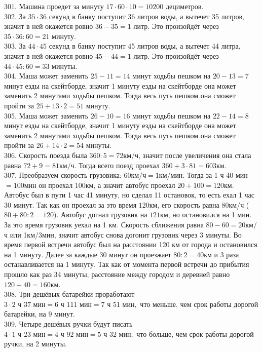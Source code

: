 301. Машина проедет за минуту $17\cdot60\cdot10=10200$ дециметров.\\
302. За $35\cdot36$ секунд в банку поступит 36 литров воды, а вытечет 35 литров, значит в ней окажется ровно $36-35=1$ литр. Это произойдёт через $35\cdot36:60=21$ минуту.\\
303. За $44\cdot45$ секунд в банку поступит 45 литров воды, а вытечет 44 литра, значит в ней окажется ровно $45-44=1$ литр. Это произойдёт через $44\cdot45:60=33$ минуты.\\
304. Маша может заменить $25-11=14$ минут ходьбы пешком на $20-13=7$ минут езды на скейтборде, значит 1 минуту езды на скейтборде она может заменить 2 минутами ходьбы пешком. Тогда весь путь пешком она сможет пройти за $25+13\cdot2=51$ минуту.\\
305. Маша может заменить $26-10=16$ минут ходьбы пешком на $22-14=8$ минут езды на скейтборде, значит 1 минуту езды на скейтборде она может заменить 2 минутами ходьбы пешком. Тогда весь путь пешком она сможет пройти за $26+14\cdot2=54$ минуты.\\
306. Скорость поезда была $360:5=72$км/ч, значит после увеличения она стала равна $72+9=81$км/ч. Тогда всего поезд проехал $360+3\cdot81=603$км.\\
307. Преобразуем скорость грузовика: 60км/ч$=1$км/мин. Тогда за 1 ч 40 мин$=100$мин он проехал $100$км, а значит автобус проехал $20+100=120$км. Автобус был в пути 1 час 41 минуту, но сделал 11 остановок, то есть ехал 1 час 30 минут. Так как он проехал за это время $120$км, его скорость равна $80$км/ч ($80+80:2=120$). Автобус догнал грузовик на $121$км, но остановился на 1 мин. За это время грузовик уехал на 1 км. Скорость сближения равна $80-60=20$км/ч или 1км/3мин, значит автобус снова догонит грузовик через 3 минуты. Во время первой встречи автобус был на расстоянии 120 км от города и остановился на 1 минуту. Далее за каждые 30 минут он проезжает $80:2=40$км и 3 раза останавливается на 1 минуту. Так как от момента первой встречи до прибытия прошло как раз 34 минуты, расстояние между городом и деревней равно
$120+40=160$км.\\
308. Три дешёвых батарейки проработают $3\cdot2\text{ ч }37\text{ мин}=6\text{ ч } 111\text{ мин}=7\text{ ч }51\text{ мин},$ что меньше, чем срок работы дорогой батарейки, на 9 минут.\\
309. Четыре дешёвых ручки будут писать $4\cdot1\text{ ч }23\text{ мин}=4\text{ ч } 92\text{ мин}=5\text{ ч }32\text{ мин},$ что больше, чем срок работы дорогой ручки, на 2 минуты.\\
